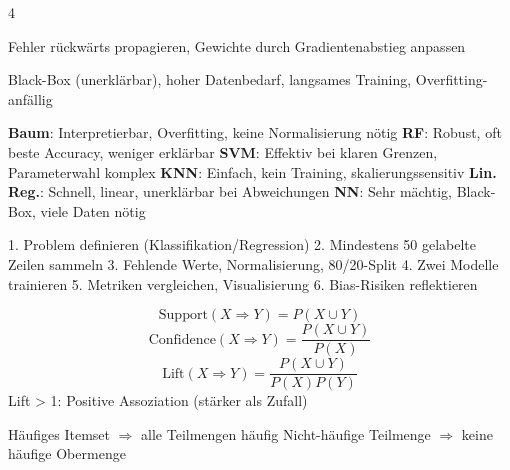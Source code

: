 \begin{landscape}
\begin{multicols*}{4}
		\begin{cheatSheetBox}[title=Backpropagation]
			Fehler rückwärts propagieren, Gewichte durch Gradientenabstieg anpassen
		\end{cheatSheetBox}

		\begin{cheatSheetBox}[title=NN-Grenzen]
			Black-Box (unerklärbar), hoher Datenbedarf, langsames Training, Overfitting-anfällig
		\end{cheatSheetBox}


		\begin{cheatSheetBox}[title=Algorithmen-Vergleich]
			\textbf{Baum}: Interpretierbar, Overfitting, keine Normalisierung nötig
			\textbf{RF}: Robust, oft beste Accuracy, weniger erklärbar
			\textbf{SVM}: Effektiv bei klaren Grenzen, Parameterwahl komplex
			\textbf{KNN}: Einfach, kein Training, skalierungssensitiv
			\textbf{Lin. Reg.}: Schnell, linear, unerklärbar bei Abweichungen
			\textbf{NN}: Sehr mächtig, Black-Box, viele Daten nötig
		\end{cheatSheetBox}


		\begin{cheatSheetBox}[title=Schritte]
			1. Problem definieren (Klassifikation/Regression)
			2. Mindestens 50 gelabelte Zeilen sammeln
			3. Fehlende Werte, Normalisierung, 80/20-Split
			4. Zwei Modelle trainieren
			5. Metriken vergleichen, Visualisierung
			6. Bias-Risiken reflektieren
		\end{cheatSheetBox}


		\begin{cheatSheetBox}[title=Zentrale Kennzahlen]
			\[
				\text{Support}(X \Rightarrow Y) = P(X \cup Y)
			\]
			\[
				\text{Confidence}(X \Rightarrow Y) = \frac{P(X \cup Y)}{P(X)}
			\]
			\[
				\text{Lift}(X \Rightarrow Y) = \frac{P(X \cup Y)}{P(X)P(Y)}
			\]
			Lift > 1: Positive Assoziation (stärker als Zufall)
		\end{cheatSheetBox}

		\begin{cheatSheetBox}[title=Apriori-Prinzip]
			Häufiges Itemset $\Rightarrow$ alle Teilmengen häufig
			Nicht-häufige Teilmenge $\Rightarrow$ keine häufige Obermenge
		\end{cheatSheetBox}


\end{multicols*}
\end{landscape}
